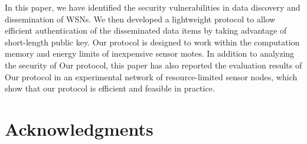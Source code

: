 \documentclass{sig-alternate-05-2015}
\begin{document}
In this paper, we have identified the security vulnerabilities in data discovery and dissemination of WSNs. We then developed a lightweight protocol  to allow efficient authentication of the disseminated data items by taking advantage of short-length public key. Our protocol is designed to work within the computation memory and energy limits of inexpensive sensor motes. In addition to analyzing the security of Our protocol, this paper has also reported the evaluation results of Our protocol in an experimental network of resource-limited sensor nodes, which show that our protocol is efficient and feasible in practice.


\section{Acknowledgments}



\appendix
\end{document}
